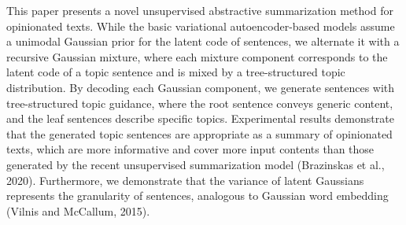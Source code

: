This paper presents a novel unsupervised abstractive summarization method for opinionated texts. While the basic variational autoencoder-based models assume a unimodal Gaussian prior for the latent code of sentences, we alternate it with a recursive Gaussian mixture, where each mixture component corresponds to the latent code of a topic sentence and is mixed by a tree-structured topic distribution. By decoding each Gaussian component, we generate sentences with tree-structured topic guidance, where the root sentence conveys generic content, and the leaf sentences describe specific topics. Experimental results demonstrate that the generated topic sentences are appropriate as a summary of opinionated texts, which are more informative and cover more input contents than those generated by the recent unsupervised summarization model (Brazinskas et al., 2020). Furthermore, we demonstrate that the variance of latent Gaussians represents the granularity of sentences, analogous to Gaussian word embedding (Vilnis and McCallum, 2015).
